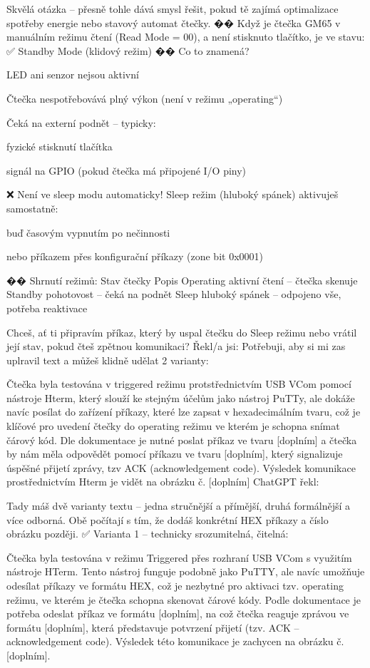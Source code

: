 Skvělá otázka – přesně tohle dává smysl řešit, pokud tě zajímá optimalizace spotřeby energie nebo stavový automat čtečky.
�� Když je čtečka GM65 v manuálním režimu čtení (Read Mode = 00), a není stisknuto tlačítko, je ve stavu:
✅ Standby Mode (klidový režim)
�� Co to znamená?

    LED ani senzor nejsou aktivní

    Čtečka nespotřebovává plný výkon (není v režimu „operating“)

    Čeká na externí podnět – typicky:

        fyzické stisknutí tlačítka

        signál na GPIO (pokud čtečka má připojené I/O piny)

❌ Není ve sleep modu automaticky!
Sleep režim (hluboký spánek) aktivuješ samostatně:

    buď časovým vypnutím po nečinnosti

    nebo příkazem přes konfigurační příkazy (zone bit 0x0001)

�� Shrnutí režimů:
Stav čtečky	Popis
Operating	aktivní čtení – čtečka skenuje
Standby	pohotovost – čeká na podnět
Sleep	hluboký spánek – odpojeno vše, potřeba reaktivace

Chceš, ať ti připravím příkaz, který by uspal čtečku do Sleep režimu nebo vrátil její stav, pokud čteš zpětnou komunikaci?
Řekl/a jsi:
Potřebuji, aby si mi zas uplravil text a můžeš klidně udělat 2 varianty:

Čtečka byla testována v triggered režimu protstřednictvím USB VCom pomocí nástroje Hterm, který slouží ke stejným účelům jako nástroj PuTTy, ale dokáže navíc posílat do zařízení příkazy, které lze zapsat v hexadecimálním tvaru, což je klíčové pro uvedení čtečky do operating režimu ve kterém je schopna snímat čárový kód. Dle dokumentace je nutné poslat příkaz ve tvaru [doplním] a čtečka by nám měla odpovědět pomocí příkazu ve tvaru [doplním], který signalizuje úspěšné přijetí zprávy, tzv ACK (acknowledgement code). Výsledek komunikace prostřednictvím Hterm je vidět na obrázku č. [doplním]
ChatGPT řekl:

Tady máš dvě varianty textu – jedna stručnější a přímější, druhá formálnější a více odborná. Obě počítají s tím, že dodáš konkrétní HEX příkazy a číslo obrázku později.
✅ Varianta 1 – technicky srozumitelná, čitelná:

    Čtečka byla testována v režimu Triggered přes rozhraní USB VCom s využitím nástroje HTerm. Tento nástroj funguje podobně jako PuTTY, ale navíc umožňuje odesílat příkazy ve formátu HEX, což je nezbytné pro aktivaci tzv. operating režimu, ve kterém je čtečka schopna skenovat čárové kódy. Podle dokumentace je potřeba odeslat příkaz ve formátu [doplním], na což čtečka reaguje zprávou ve formátu [doplním], která představuje potvrzení přijetí (tzv. ACK – acknowledgement code). Výsledek této komunikace je zachycen na obrázku č. [doplním].

